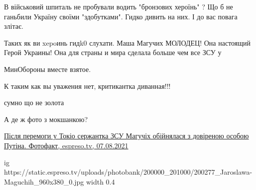 \begin{itemize}
В військовий шпиталь не пробували водить "бронзових хероїнь" ? Що б не ганьбили
Україну своїми "здобутками".  Гидко дивить на них. І до вас повага злітає.

\begin{itemize}
 
Таких як ви xepoинь гидk0 слухати. Маша Магучих МОЛОДЕЦ! Она настоящий Герой
Украины! Она для страны и мира сделала больше чем все ЗСУ у

МинОбороны вместе взятое.

 
К таким как вы уважения нет, критикантка диванная!!!
\end{itemize}

 
сумно що не золота

 
А де ж фото з мокшанкою?


\href{https://espreso.tv/pislya-peremogi-u-tokio-serzhantka-zsu-maguchikh-obiynyalasya-z-dovirenoyu-osoboyu-putina-fotofakt}{%
Після перемоги у Токіо сержантка ЗСУ Магучіх обійнялася з довіреною особою Путіна. Фотофакт, espreso.tv, 07.08.2021%
}

\ifcmt
  ig https://static.espreso.tv/uploads/photobank/200000_201000/200277_Jaroslawa-Maguchih_960x380_0.jpg
  width 0.4
\fi


\end{itemize}
